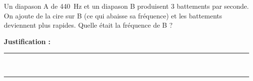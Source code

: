 Un diapason A de \qty{440}{Hz} et un diapason B produisent \num{3} battements par seconde. On ajoute de la cire sur B (ce qui abaisse sa fréquence) et les battements deviennent plus rapides. Quelle était la fréquence de B ?

\choices

\noindent\textbf{Justification :} \hrulefill \\[2.5ex]
\rule{\linewidth}{0.4pt} \\[2.5ex]
\rule{\linewidth}{0.4pt}
\vfill
